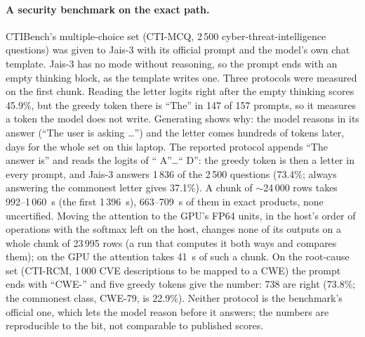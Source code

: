 \documentclass[11pt]{article}
\begin{document}
\paragraph{A security benchmark on the exact path.} CTIBench's multiple-choice set (CTI-MCQ, 2\,500 cyber-threat-intelligence
questions) was given to Jais-3 with its official prompt and the model's own chat template. Jais-3 has no mode without
reasoning, so the prompt ends with an empty thinking block, as the template writes one. Three protocols were measured on the
first chunk. Reading the letter logits right after the empty thinking scores 45.9\%, but the greedy token there is ``The'' in
147 of 157 prompts, so it measures a token the model does not write. Generating shows why: the model reasons in its answer
(``The user is asking \ldots'') and the letter comes hundreds of tokens later, days for the whole set on this laptop. The
reported protocol appends ``The answer is'' and reads the logits of `` A''\ldots`` D'': the greedy token is then a letter in
every prompt, and Jais-3 answers 1\,836 of the 2\,500 questions (73.4\%; always answering the commonest letter gives 37.1\%).
A chunk of $\sim$24\,000 rows takes 992--1\,060~s (the first 1\,396~s), 663--709~s of them in exact products, none uncertified. Moving the attention to the GPU's FP64 units, in the host's order of
operations with the softmax left on the host, changes none of its outputs on a whole chunk of 23\,995 rows (a run that
computes it both ways and compares them); on the GPU the attention takes 41~s of such a chunk. On the root-cause set
(CTI-RCM, 1\,000 CVE descriptions to be mapped to a CWE) the prompt ends with ``CWE-'' and five greedy tokens give the number:
738 are right (73.8\%; the commonest class, CWE-79, is 22.9\%). Neither protocol is the benchmark's
official one, which lets the model reason before it answers; the numbers are reproducible to the bit, not comparable to
published scores.
\fussy
\end{document}

